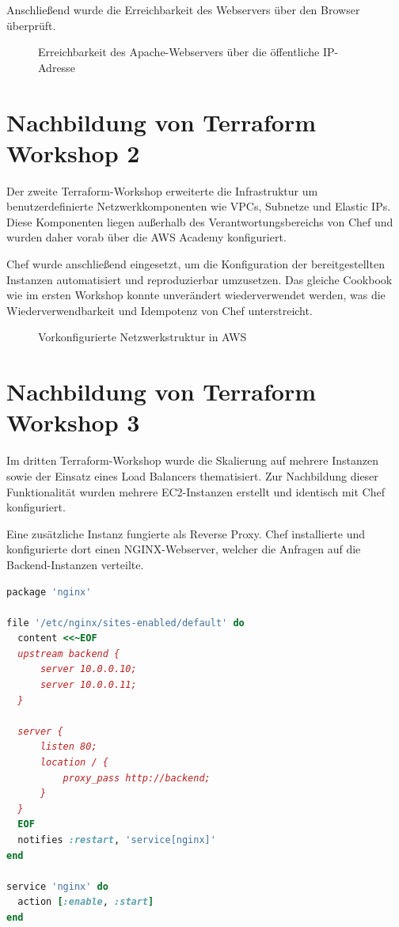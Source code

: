\documentclass[BMR,Seminar,ngerman,IEEE]{twbook}
\newcommand{\placeholderfig}[2]{%
  \begin{figure}[htbp]
    \centering
    \fbox{\rule{0pt}{120pt}\rule{0.9\linewidth}{0pt}}%
    \caption{#1}%
    \label{fig:#2}%
  \end{figure}%
}
\begin{document}
Anschließend wurde die Erreichbarkeit des Webservers über den Browser überprüft.

\placeholderfig{Erreichbarkeit des Apache-Webservers über die öffentliche IP-Adresse}{apache-browser}

\section{Nachbildung von Terraform Workshop 2}

Der zweite Terraform-Workshop erweiterte die Infrastruktur um benutzerdefinierte Netzwerkkomponenten
wie VPCs, Subnetze und Elastic IPs.
Diese Komponenten liegen außerhalb des Verantwortungsbereichs von Chef und wurden daher
vorab über die AWS Academy konfiguriert.

Chef wurde anschließend eingesetzt, um die Konfiguration der bereitgestellten Instanzen
automatisiert und reproduzierbar umzusetzen.
Das gleiche Cookbook wie im ersten Workshop konnte unverändert wiederverwendet werden,
was die Wiederverwendbarkeit und Idempotenz von Chef unterstreicht.

\placeholderfig{Vorkonfigurierte Netzwerkstruktur in AWS}{aws-network}

\section{Nachbildung von Terraform Workshop 3}

Im dritten Terraform-Workshop wurde die Skalierung auf mehrere Instanzen sowie der Einsatz
eines Load Balancers thematisiert.
Zur Nachbildung dieser Funktionalität wurden mehrere EC2-Instanzen erstellt und identisch
mit Chef konfiguriert.

Eine zusätzliche Instanz fungierte als Reverse Proxy.
Chef installierte und konfigurierte dort einen NGINX-Webserver, welcher die Anfragen
auf die Backend-Instanzen verteilte.

\begin{lstlisting}[language=Ruby, caption={Chef-Rezept zur Konfiguration eines NGINX Load Balancers}]
package 'nginx'

file '/etc/nginx/sites-enabled/default' do
  content <<~EOF
  upstream backend {
      server 10.0.0.10;
      server 10.0.0.11;
  }

  server {
      listen 80;
      location / {
          proxy_pass http://backend;
      }
  }
  EOF
  notifies :restart, 'service[nginx]'
end

service 'nginx' do
  action [:enable, :start]
end
\end{lstlisting}
\end{document}
